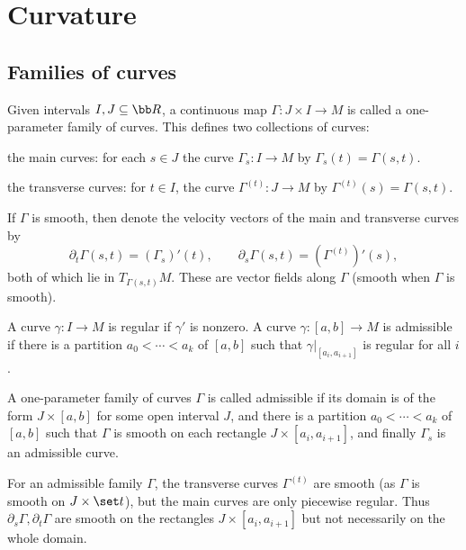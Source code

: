 \section{Curvature}

\subsection{Families of curves}

\bdefn

    Given intervals $I,J\subseteq\bR$, a continuous map $\Gamma\colon J\times I\to M$ is called a {\emphcolor one-parameter
    family of curves}.
    This defines two collections of curves:
    \benum
        \item the {\emphcolor main curves}: for each $s\in J$ the curve $\Gamma_s\colon I\to M$ by $\Gamma_s(t)=\Gamma(s,t)$.
        \item the {\emphcolor transverse curves}: for $t\in I$, the curve $\Gamma^{(t)}\colon J\to M$ by
        $\Gamma^{(t)}(s)=\Gamma(s,t)$.
    \eenum

\edefn

If $\Gamma$ is smooth, then denote the velocity vectors of the main and transverse curves by
$$ \partial_t\Gamma(s,t) = (\Gamma_s)'(t),\qquad \partial_s\Gamma(s,t) = (\Gamma^{(t)})'(s) , $$
both of which lie in $T_{\Gamma(s,t)}M$.
These are vector fields along $\Gamma$ (smooth when $\Gamma$ is smooth).

\bdefn

    A curve $\gamma\colon I\to M$ is {\emphcolor regular} if $\gamma'$ is nonzero.
    A curve $\gamma\colon[a,b]\to M$ is {\emphcolor admissible} if there is a partition $a_0<\cdots<a_k$ of $[a,b]$
    such that $\gamma|_{[a_i,a_{i+1}]}$ is regular for all $i$.

    A one-parameter family of curves $\Gamma$ is called {\emphcolor admissible} if its domain is of the form
    $J\times[a,b]$ for some open interval $J$, and there is a partition $a_0<\cdots<a_k$ of $[a,b]$ such that
    $\Gamma$ is smooth on each rectangle $J\times[a_i,a_{i+1}]$, and finally $\Gamma_s$ is an admissible curve.

\edefn

For an admissible family $\Gamma$, the transverse curves $\Gamma^{(t)}$ are smooth (as $\Gamma$ is smooth on
$J\times\set t$), but the main curves are only piecewise regular.
Thus $\partial_s\Gamma,\partial_t\Gamma$ are smooth on the rectangles $J\times[a_i,a_{i+1}]$ but not necessarily on the whole
domain.

